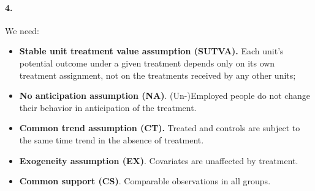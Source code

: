 \documentclass{scrartcl}
\begin{document}
\begin{table}[!h]
\centering
\caption{\label{tab:final_mean_char}Mean observed characteristics by Treatment Group and Period}
\centering
{}
\end{table}

\paragraph*{4.}

We need:

\begin{itemize}[label=$\blacktriangleright$]
    \item \textbf{Stable unit treatment value assumption (SUTVA).} Each unit’s potential outcome under a given treatment depends only on its own treatment assignment, not on the treatments received by any other units;\
    \item \textbf{No anticipation assumption (NA)}. (Un-)Employed people do not change their behavior in anticipation of the treatment. \
    \item \textbf{Common trend assumption (CT).} Treated and controls are subject to the same time trend in the absence of treatment. \
    \item \textbf{Exogeneity assumption (EX)}. Covariates are unaffected by treatment.\ 
    \item \textbf{Common support (CS)}. Comparable observations in all groups.
\end{itemize}
\end{document}
